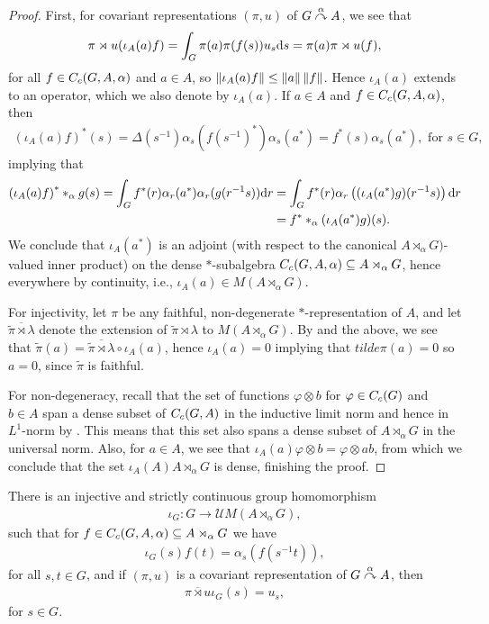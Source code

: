 \begin{proof}
First, for covariant representations $(\pi,u)$ of $G \stackrel{\alpha}{\curvearrowright} A$, we see that
\begin{align*}
\pi \rtimes u(\iota_A(a) f) = \int_G \pi(a) \pi(f(s)) u_s \mathrm{d} s = \pi(a) \pi \rtimes u (f),
\end{align*}
for all $f \in C_c(G,A,\alpha)$ and $a \in A$, so $\left\lVert \iota_A(a) f \right\rVert \leq \left\lVert a \right\rVert \left\lVert f \right\rVert$. Hence $\iota_A(a)$ extends to an operator, which we also denote by $\iota_A(a)$. If $a \in A$ and $f \in C_c(G,A,\alpha)$, then 
\begin{align*}
\left( \iota_A(a) f \right)^*(s) = \Delta(s^{-1}) \alpha_s(f(s^{-1})^*) \alpha_s(a^*) = f^*(s) \alpha_s(a^*), \text{ for }s \in G,
\end{align*}
implying that
\begin{align*}
\left( \iota_A(a) f \right)^* \ast_\alpha g (s) = \int_G f^*(r) \alpha_r(a^*) \alpha_r(g(r^{-1}s)) \mathrm{d} r &= \int_G f^*(r) \alpha_r \left(  (\iota_A(a^*) g)(r^{-1}s)\right) \mathrm{d} r \\
&= f^* \ast_\alpha(\iota_A(a^*) g)(s).
\end{align*}
We conclude that $\iota_A(a^*)$ is an adjoint (with respect to the canonical $A \rtimes_\alpha G)$-valued inner product) on the dense $*$-subalgebra $C_c(G,A,\alpha) \subseteq A \rtimes_\alpha G$, hence everywhere by continuity, i.e., $\iota_A(a) \in M(A \rtimes_\alpha G)$. 

For injectivity, let $\pi$ be any faithful, non-degenerate $*$-representation of $A$, and let $\overline{\tilde \pi \rtimes \lambda}$ denote the extension of $\tilde \pi \rtimes \lambda$ to $M(A \rtimes_\alpha G)$. By  and the above, we see that $\tilde \pi(a) = \overline{\tilde \pi \rtimes \lambda } \circ \iota_A(a)$, hence $\iota_A(a) = 0$ implying that $tilde \pi(a) = 0$ so $ a = 0$, since $\tilde \pi$ is faithful.

For non-degeneracy, recall that the set of functions $\varphi \otimes b$ for $\varphi \in C_c(G)$ and $b \in A $ span a dense subset of $C_c(G,A)$ in the inductive limit norm and hence in $L^1$-norm by . This means that this set also spans a dense subset of $A \rtimes_\alpha G$ in the universal norm. Also, for $a \in A$, we see that $\iota_A(a) \varphi \otimes b = \varphi \otimes ab$, from which we conclude that the set $\iota_A(A) A \rtimes_\alpha G$ is dense, finishing the proof.
\end{proof}
\begin{lemma}
There is an injective and strictly continuous group homomorphism
\begin{align*}
	\iota_G \colon G \to \mathcal{U} M(A \rtimes_\alpha G),
\end{align*}
such that for $f \in C_c(G,A,\alpha) \subseteq A \rtimes_\alpha G$ we have
\begin{align*}
	\iota_G(s) f(t) = \alpha_s (f(s^{-1}t)),
\end{align*}
for all $s,t \in G$, and if $(\pi,u)$ is a covariant representation of $G \stackrel{\alpha}{\curvearrowright} A$, then
\begin{align*}
	\overline{\pi \rtimes u} \iota_G(s) =u_s,
\end{align*}
for $s \in G$.
\end{lemma}
